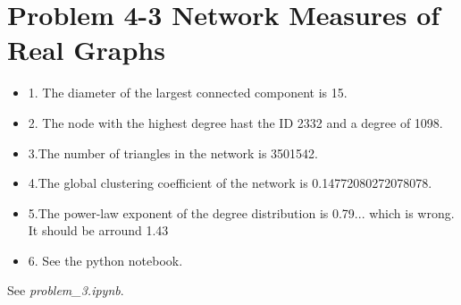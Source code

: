 \section{Problem 4-3 Network Measures of Real Graphs}
\begin{itemize}
\item 1. The diameter of the largest connected component is 15.
\item 2. The node with the highest degree hast the ID 2332 and a degree of 1098.
\item 3.The number of triangles in the network is 3501542.
\item 4.The global clustering coefficient of the network is 0.14772080272078078.
\item 5.The power-law exponent of the degree distribution is 0.79...  which is wrong.  It should be arround 1.43
\item 6.  See the python notebook.
\end{itemize}
See \textit{problem\_3.ipynb}.
